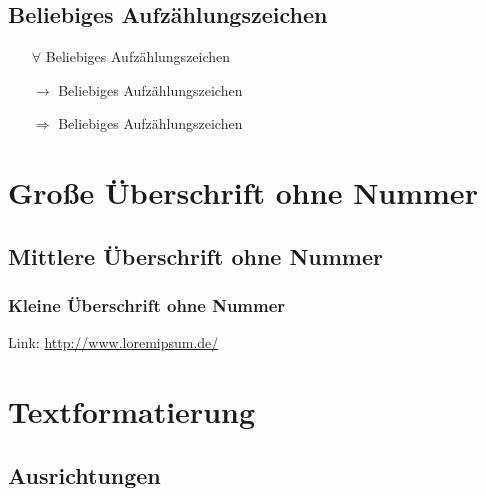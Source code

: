 \documentclass[a4paper,12pt]{article}
\begin{document}
\subsection{Beliebiges Aufzählungszeichen}
\begin{itemize}
	\item [$\forall$] Beliebiges Aufzählungszeichen
	\item [$\rightarrow$] Beliebiges Aufzählungszeichen
	\item [$\Rightarrow$] Beliebiges Aufzählungszeichen
\end{itemize}

\newpage


\section*{Große Überschrift ohne Nummer}
\subsection*{Mittlere Überschrift ohne Nummer}
\subsubsection*{Kleine Überschrift ohne Nummer}

Link: \url{http://www.loremipsum.de/}


\newpage

\section{Textformatierung}
\subsection{Ausrichtungen}
\end{document}
